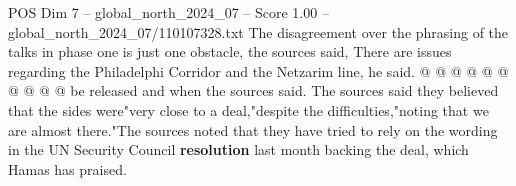 \begin{textsample}{POS Dim 7 – global\_north\_2024\_07 – Score 1.00 – global\_north\_2024\_07/110107328.txt}
The disagreement over the phrasing of the talks in phase one is just one obstacle, the sources said, There are issues regarding the Philadelphi Corridor and the Netzarim line, he said. @ @ @ @ @ @ @ @ @ @ be released and when the sources said.
The sources said they believed that the sides were"very close to a deal,"despite the difficulties,"noting that we are almost there."The sources noted that they have tried to rely on the wording in the UN Security Council \textbf{resolution} last month backing the deal, which Hamas has praised.

\end{textsample}
